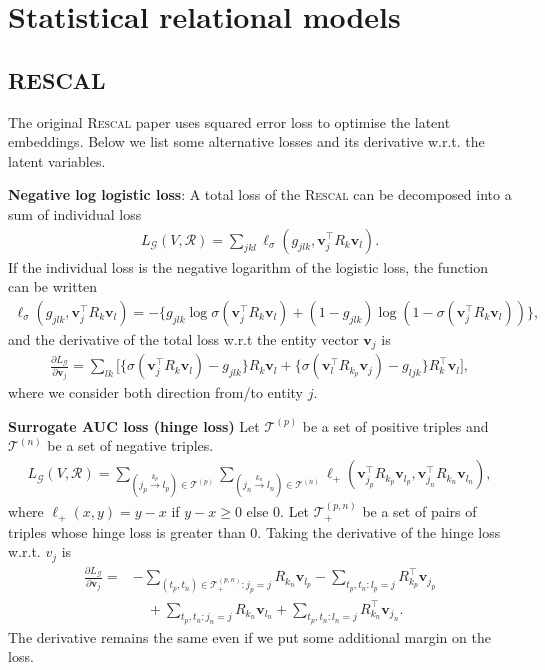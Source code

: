 \documentclass{article} %
\theoremstyle{definition}
\newcommand\mc{\mathcal} %
\newcommand\ts{\mathcal} %
\newcommand\mt{} %
\newcommand\vt{\mathbf} %
\newcommand\triple[3]{(#1 \stackrel{#2}\rightarrow #3)}
\begin{document}
\section*{Statistical relational models}
\subsection*{RESCAL}
The original \textsc{Rescal} paper uses squared error loss to optimise the latent embeddings. Below we list some alternative losses and its derivative w.r.t. the latent variables.

\textbf{Negative log logistic loss}:
A total loss of the \textsc{Rescal} can be decomposed into a sum of individual loss
\begin{align}
L_\ts{G}(\mt{V}, \ts{R}) = \sum_{jkl} \ell_\sigma(g_{jlk}, \vt{v}_j^\top \mt{R}_{k} \vt{v}_l).
\end{align}
If the individual loss is the negative logarithm of the logistic loss, the function can be written
\begin{align}
\ell_\sigma(g_{jlk}, \vt{v}_j^\top \mt{R}_{k} \vt{v}_l) = - \bigg\{g_{jlk} \log \sigma(\vt{v}_j^\top \mt{R}_{k} \vt{v}_l) + (1- g_{jlk}) \log (1- \sigma(\vt{v}_j^\top \mt{R}_{k} \vt{v}_l))\bigg\},
\end{align}
and the derivative of the total loss w.r.t the entity vector $\vt{v}_j$ is
\begin{align}
\frac{\partial L_\ts{G}}{\partial \vt{v}_j} =  \sum_{lk}\bigg[\Big\{\sigma(\vt{v}_j^\top \mt{R}_{k} \vt{v}_l) - g_{jlk}\Big\} \mt{R}_{k} \vt{v}_l + \Big\{\sigma(\vt{v}_l^\top \mt{R}_{k_p} \vt{v}_j) - g_{ljk}\Big\} \mt{R}_{k}^\top \vt{v}_l \bigg],
\end{align}
where we consider both direction from/to entity $j$.

\textbf{Surrogate AUC loss (hinge loss)}
Let $\mc{T}^{(p)}$ be a set of positive triples and $\mc{T}^{(n)}$ be a set of negative triples.
\begin{align}
L_\ts{G}(\mt{V}, \ts{R}) = \sum_{\triple{j_p}{k_p}{l_p} \in \mc{T}^{(p)}}\sum_{\triple{j_n}{k_n}{l_n} \in \mc{T}^{(n)}} \ell_+(\vt{v}_{j_p}^\top \mt{R}_{k_p} \vt{v}_{l_p}, \vt{v}_{j_n}^\top \mt{R}_{k_n} \vt{v}_{l_n}),
\end{align}
where $\ell_+(x, y) = y - x$ if $y - x \geq 0$ else 0. Let $\mc{T}_+^{(p,n)}$ be a set of pairs of triples whose hinge loss is greater than 0. Taking the derivative of the hinge loss w.r.t. $v_j$ is
\begin{align}
\frac{\partial L_\ts{G}}{\partial \vt{v}_j} = &
- \sum_{(t_p, t_n) \in \mc{T}_+^{(p,n)} : j_p = j} \mt{R}_{k_n}\vt{v}_{l_p} - \sum_{t_p, t_n: l_p = j} \mt{R}_{k_p}^\top \vt{v}_{j_p} \\
& \quad + \sum_{t_p, t_n: j_n = j} \mt{R}_{k_n}\vt{v}_{l_n}  + \sum_{t_p, t_n: l_n = j} \mt{R}_{k_n}^\top \vt{v}_{j_n}.
\end{align}
The derivative remains the same even if we put some additional margin on the loss.
\end{document}
